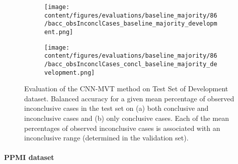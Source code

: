 \begin{figure}[ht]
  \begin{subfigure}{0.9\textwidth}
    \centering
    \texttt{[image: content/figures/evaluations/baseline\_majority/86/bacc\_obsInconclCases\_baseline\_majority\_development.png]}
    \subcaption{}
    \label{fig:bacc_obsInconclCases_baseline_majority_development}
  \end{subfigure}
  \hfill
  \begin{subfigure}{0.9\textwidth}
    \centering
    \texttt{[image: content/figures/evaluations/baseline\_majority/86/bacc\_obsInconclCases\_concl\_baseline\_majority\_development.png]}
    \subcaption{}
    \label{fig:bacc_obsInconclCases_concl_baseline_majority_development}
  \end{subfigure}

  \caption{Evaluation of the CNN-MVT method on Test Set of Development dataset.
  Balanced accuracy for a given mean percentage of observed inconclusive cases in the test set on 
  (a) both conclusive and inconclusive cases and (b) only conclusive cases. 
  Each of the mean percentages of observed inconclusive cases is associated with an inconclusive range (determined in the validation set). }
  \label{fig:bacc_obsInconclCases_baseline_majority_development_full}
\end{figure}




\paragraph{PPMI dataset}

